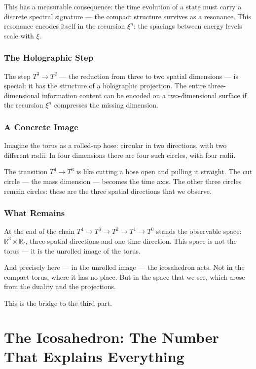 \documentclass[12pt,oneside]{book}
\begin{document}
This has a measurable consequence: the time evolution of a state must carry a discrete spectral signature --- the compact structure survives as a resonance. This resonance encodes itself in the recursion $\xi^n$: the spacings between energy levels scale with $\xi$.

\section{The Holographic Step}

The step $T^3 \to T^2$ --- the reduction from three to two spatial dimensions --- is special: it has the structure of a holographic projection. The entire three-dimensional information content can be encoded on a two-dimensional surface if the recursion $\xi^n$ compresses the missing dimension.

\section{A Concrete Image}

Imagine the torus as a rolled-up hose: circular in two directions, with two different radii. In four dimensions there are four such circles, with four radii.

The transition $T^4 \to T^3$ is like cutting a hose open and pulling it straight. The cut circle --- the mass dimension --- becomes the time axis. The other three circles remain circles: these are the three spatial directions that we observe.

\section{What Remains}

At the end of the chain $T^4 \to T^3 \to T^2 \to T^1 \to T^0$ stands the observable space: $\mathbb{R}^3 \times \mathbb{R}_t$, three spatial directions and one time direction. This space is not the torus --- it is the unrolled image of the torus.

And precisely here --- in the unrolled image --- the icosa\-hedron acts. Not in the compact torus, where it has no place. But in the space that we see, which arose from the duality and the projections.

This is the bridge to the third part.

\part{The Icosahedron: The Number That Explains Everything}
\end{document}
